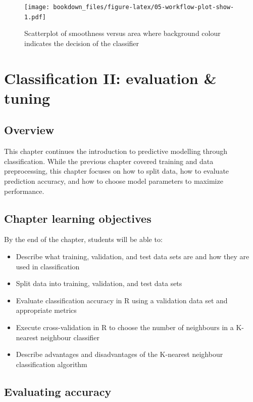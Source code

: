 \documentclass[
]{krantz}
\providecommand{\tightlist}{%
  \setlength{\itemsep}{0pt}\setlength{\parskip}{0pt}}
\begin{document}
\begin{figure}
\centering
\texttt{[image: bookdown\_files/figure-latex/05-workflow-plot-show-1.pdf]}
\caption{\label{fig:05-workflow-plot-show}Scatterplot of smoothness versus area where background colour indicates the decision of the classifier}
\end{figure}

\hypertarget{classification_continued}{%
\chapter{Classification II: evaluation \& tuning}\label{classification_continued}}

\hypertarget{overview-5}{%
\section{Overview}\label{overview-5}}

This chapter continues the introduction to predictive modelling through
classification. While the previous chapter covered training and data
preprocessing, this chapter focuses on how to split data, how to evaluate
prediction accuracy, and how to choose model parameters to maximize
performance.

\hypertarget{chapter-learning-objectives-6}{%
\section{Chapter learning objectives}\label{chapter-learning-objectives-6}}

By the end of the chapter, students will be able to:

\begin{itemize}
\tightlist
\item
  Describe what training, validation, and test data sets are and how they are used in classification
\item
  Split data into training, validation, and test data sets
\item
  Evaluate classification accuracy in R using a validation data set and appropriate metrics
\item
  Execute cross-validation in R to choose the number of neighbours in a K-nearest neighbour classifier
\item
  Describe advantages and disadvantages of the K-nearest neighbour classification algorithm
\end{itemize}

\hypertarget{evaluating-accuracy}{%
\section{Evaluating accuracy}\label{evaluating-accuracy}}
\end{document}
